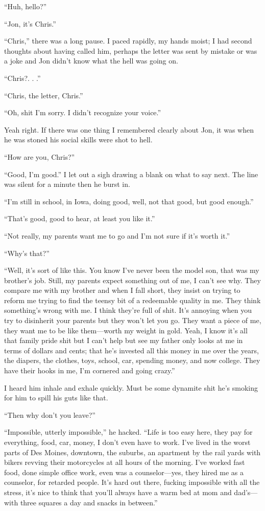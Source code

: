 ``Huh, hello?''

``Jon, it's Chris.''

``Chris,'' there was a long pause. I paced rapidly, my hands moist; I
had second thoughts about having called him, perhaps the letter was sent
by mistake or was a joke and Jon didn't know what the hell was going on.

``Chris?. . .''

``Chris, the letter, Chris.''

``Oh, shit I'm sorry. I didn't recognize your voice.''

Yeah right. If there was one thing I remembered clearly about Jon, it
was when he was stoned his social skills were shot to hell.

``How are you, Chris?''

``Good, I'm good.'' I let out a sigh drawing a blank on what to say
next. The line was silent for a minute then he burst in.

``I'm still in school, in Iowa, doing good, well, not that good, but
good enough.''

``That's good, good to hear, at least you like it.''

``Not really, my parents want me to go and I'm not sure if it's worth
it.''

``Why's that?''

``Well, it's sort of like this. You know I've never been the model son,
that was my brother's job. Still, my parents expect something out of me,
I can't see why. They compare me with my brother and when I fall short,
they insist on trying to reform me trying to find the teensy bit of a
redeemable quality in me. They think something's wrong with me. I think
they're full of shit. It's annoying when you try to disinherit your
parents but they won't let you go. They want a piece of me, they want me
to be like them---worth my weight in gold. Yeah, I know it's all that
family pride shit but I can't help but see my father only looks at me in
terms of dollars and cents; that he's invested all this money in me over
the years, the diapers, the clothes, toys, school, car, spending money,
and now college. They have their hooks in me, I'm cornered and going
crazy.''

I heard him inhale and exhale quickly. Must be some dynamite shit he's
smoking for him to spill his guts like that.

``Then why don't you leave?''

``Impossible, utterly impossible,'' he hacked. ``Life is too easy here,
they pay for everything, food, car, money, I don't even have to work.
I've lived in the worst parts of Des Moines, downtown, the suburbs, an
apartment by the rail yards with bikers revving their motorcycles at all
hours of the morning. I've worked fast food, done simple office work,
even was a counselor---yes, they hired me as a counselor, for retarded
people. It's hard out there, fucking impossible with all the stress,
it's nice to think that you'll always have a warm bed at mom and
dad's---with three squares a day and snacks in between.''

